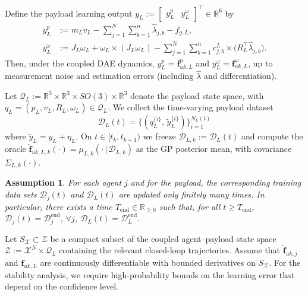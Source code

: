 \documentclass[letterpaper, 10 pt, conference]{ieeeconf}  %
\newcommand{\0}{\matr{0}}
\newtheorem{assumption}{Assumption}
\begin{document}

Define the payload learning output
$y_L :=
\begin{bmatrix}
y_L^{p} &
y_L^{\omega}
\end{bmatrix}^{\top}
\in\mathbb R^6$ by
\begin{align*}
y_L^{p}
&:= m_L\dot v_L - \sum_{j=1}^{N}\sum_{b=1}^{n} \hat\lambda_{j,b} - f_{g,L},\\
y_L^{\omega}
&:= J_L\dot\omega_L + \omega_L\times(J_L\omega_L)
- \sum_{j=1}^{N}\sum_{b=1}^{n}
c^L_{j,b}\times\!\big(R_L^\top\hat\lambda_{j,b}\big).
\end{align*}
Then, under the coupled DAE dynamics,
$y_L^{p}=\mathbf f_{uk,L}^{p}$ and $y_L^{\omega}=\mathbf f_{uk,L}^{\omega}$,
up to measurement noise and estimation errors (including $\hat\lambda$ and differentiation).

Let $\mathcal Q_L := \mathbb R^3\times\mathbb R^3\times SO(3)\times\mathbb R^3$ denote the payload state space,
with $q_L=(p_L,v_L,R_L,\omega_L)\in\mathcal Q_L$. We collect the time-varying payload dataset
\begin{equation}
\mathcal D_L(t)=\{(q_L^{\{i\}},\,\tilde y_L^{\{i\}})\}_{i=1}^{N_L(t)}
\label{eq:dataset_payload_online}
\end{equation}
where $\tilde y_L=y_L+\eta_L$.
On $t\in[t_k,t_{k+1})$ we freeze $\mathcal D_{L,k}:=\mathcal D_L(t)$ and compute the oracle
$\hat{\mathbf f}_{uk,L,k}(\cdot)=\mu_{L,k}(\cdot\,|\,\mathcal D_{L,k})$ as the GP posterior mean, with covariance $\Sigma_{L,k}(\cdot)$.

\begin{assumption}
\label{ass:dataset}
For each agent $j$ and for the payload, the corresponding training data sets
$\mathcal D_j(t)$ and $\mathcal D_L(t)$ are updated only finitely many times.
In particular, there exists a time $T_{\mathrm{end}}\in\mathbb{R}_{\ge 0}$ such that,
for all $t\ge T_{\mathrm{end}}$, $\mathcal D_j(t)=\mathcal D_j^{\mathrm{end}}$, $\forall j$, $\mathcal D_L(t)=\mathcal D_L^{\mathrm{end}}$.
\end{assumption}




Let $S_{\mathcal X}\subset \mathcal Z$ be a compact subset of the coupled agent--payload state space
$\mathcal Z := \mathcal X^N \times \mathcal Q_L$ containing the relevant closed-loop trajectories.
Assume that $\hat{\mathbf f}_{uk,j}$ and $\hat{\mathbf f}_{uk,L}$ are continuously differentiable with bounded derivatives on $S_{\mathcal X}$.
For the stability analysis, we require high-probability bounds on the learning error that depend on the confidence level.
\end{document}
